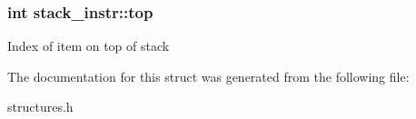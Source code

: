 \subsubsection[{top}]{\setlength{\rightskip}{0pt plus 5cm}int stack\+\_\+instr\+::top}\label{structstack__instr_a1b85b397a6e1175d2ec961ce410ac9fa}
Index of item on top of stack 

The documentation for this struct was generated from the following file\+:\begin{DoxyCompactItemize}
\item 
structures.\+h\end{DoxyCompactItemize}
